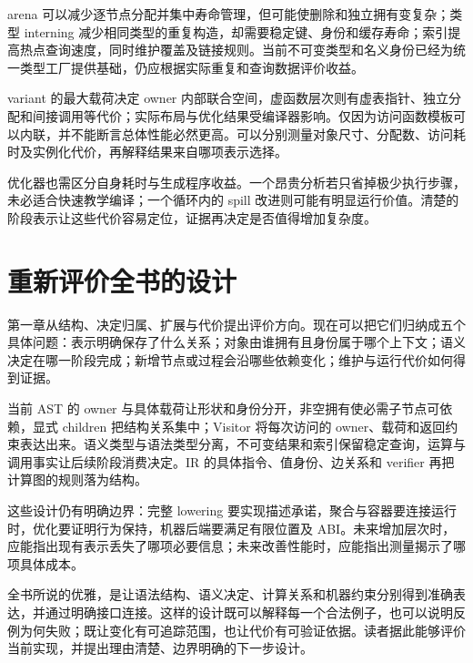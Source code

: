 arena 可以减少逐节点分配并集中寿命管理，但可能使删除和独立拥有变复杂；类型 interning 减少相同类型的重复构造，却需要稳定键、身份和缓存寿命；索引提高热点查询速度，同时维护覆盖及链接规则。当前不可变类型和名义身份已经为统一类型工厂提供基础，仍应根据实际重复和查询数据评价收益。

variant 的最大载荷决定 owner 内部联合空间，虚函数层次则有虚表指针、独立分配和间接调用等代价；实际布局与优化结果受编译器影响。仅因为访问函数模板可以内联，并不能断言总体性能必然更高。可以分别测量对象尺寸、分配数、访问耗时及实例化代价，再解释结果来自哪项表示选择。

优化器也需区分自身耗时与生成程序收益。一个昂贵分析若只省掉极少执行步骤，未必适合快速教学编译；一个循环内的 spill 改进则可能有明显运行价值。清楚的阶段表示让这些代价容易定位，证据再决定是否值得增加复杂度。

\section{重新评价全书的设计}
第一章从结构、决定归属、扩展与代价提出评价方向。现在可以把它们归纳成五个具体问题：表示明确保存了什么关系；对象由谁拥有且身份属于哪个上下文；语义决定在哪一阶段完成；新增节点或过程会沿哪些依赖变化；维护与运行代价如何得到证据。

当前 AST 的 owner 与具体载荷让形状和身份分开，非空拥有使必需子节点可依赖，显式 children 把结构关系集中；Visitor 将每次访问的 owner、载荷和返回约束表达出来。语义类型与语法类型分离，不可变结果和索引保留稳定查询，运算与调用事实让后续阶段消费决定。IR 的具体指令、值身份、边关系和 verifier 再把计算图的规则落为结构。

这些设计仍有明确边界：完整 lowering 要实现描述承诺，聚合与容器要连接运行时，优化要证明行为保持，机器后端要满足有限位置及 ABI。未来增加层次时，应能指出现有表示丢失了哪项必要信息；未来改善性能时，应能指出测量揭示了哪项具体成本。

全书所说的优雅，是让语法结构、语义决定、计算关系和机器约束分别得到准确表达，并通过明确接口连接。这样的设计既可以解释每一个合法例子，也可以说明反例为何失败；既让变化有可追踪范围，也让代价有可验证依据。读者据此能够评价当前实现，并提出理由清楚、边界明确的下一步设计。
